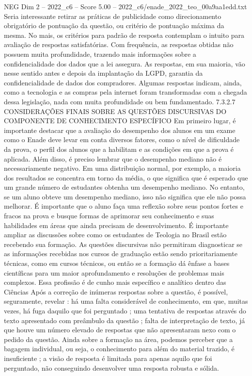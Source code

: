 \begin{textsample}{NEG Dim 2 – 2022\_c6 – Score 5.00 – 2022\_c6/enade\_2022\_teo\_00a9aa1edd.txt}
Seria interessante retirar as práticas de publicidade como direcionamento obrigatório de pontuação da questão, ou critério de pontuação máxima da mesma.
No mais, os critérios para padrão de resposta contemplam o intuito para avaliação de respostas satisfatórias.
Com frequência, as respostas obtidas não possuem muita profundidade, trazendo mais informações sobre a confidencialidade dos dados que a lei assegura.
As respostas, em sua maioria, vão nesse sentido antes e depois da implantação da LGPD, garantia da confidencialidade de dados dos compradores.
Algumas respostas indicam, ainda, como a tecnologia e as compras pela internet foram transformadas com a chegada dessa legislação, nada com muita profundidade ou bem fundamentado. 7.3.2.7 CONSIDERAÇÕES FINAIS SOBRE AS QUESTÕES DISCURSIVAS DO COMPONENTE DE CONHECIMENTO ESPECÍFICO Em primeiro lugar, é importante destacar que a avaliação do desempenho dos alunos em um exame como o Enade deve levar em conta diversos fatores, como o nível de dificuldade da prova, o perfil dos alunos que a habilitam e as condições em que a prova é aplicada.
Além disso, é preciso lembrar que o desempenho mediano não é necessariamente negativo.
Em uma distribuição normal, por exemplo, a maioria dos resultados se concentra em torno da média, o que significa que é esperado que um grande número de estudantes obtenha um desempenho mediano.
No entanto, se um aluno obteve um desempenho mediano, isso não significa que ele não possa melhorar.
É importante que o aluno faça uma reflexão sobre seus pontos fortes e fracos na prova e busque formas de aprimorar seu conhecimento e suas habilidades em áreas que ainda precisam de desenvolvimento.
É importante ampliar as discussões sobre como os estudantes de Teologia no Brasil estão recebendo sua formação.
As questões discursivas não permitiram diagnosticar se as informações recebidas nos cursos de graduação estão sendo prioritariamente técnicas, como em cursos técnicos, ou então se a formação dá ênfase a bases científicas para um maior aprofundamento e resoluções de problemas mais complexos.
Essa profissão é de cunho mais específico e analítico dentro das Ciências Após a correção de inúmeras respostas sobre a questão, é possível, seguramente, revelar : há uma falta considerável de conhecimento, em que, muitas vezes, há fuga daquilo que foi perguntado ; uma tentativa de respostas através do texto apresentado com preâmbulo da questão ; falta de interpretação de texto, já que houve um número elevado de respostas que não apresentaram nexo com o pedido da questão.
Ainda sobre a formação na área, podemos perceber que a bagagem individual, ou seja, o conhecimento para além do material trazido, é insuficiente ; a visão de resposta é limitada para apenas aquilo que foi perguntado, não conseguindo desenvolver uma resposta robusta e sólida.

\end{textsample}
